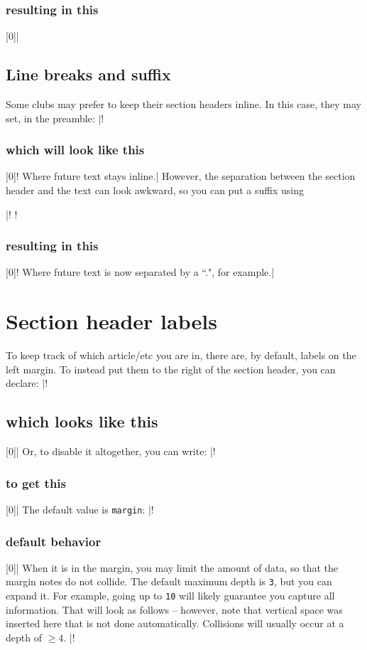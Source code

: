 \documentclass{constitution}
\begin{document}
\subsubsection{resulting in this}[0]|

\subsection{Line breaks and suffix}
Some clubs may prefer to keep their section headers inline.
In this case, they may set, in the preamble:
\coderunex|!
\subsubsection{which will look like this}[0]!
Where future text stays inline.|
However, the separation between the section header and the text can look awkward, so you can put a suffix using\par
\coderunex|!
\def\afterheadertext{.}!
\subsubsection{resulting in this}[0]!
Where future text is now separated by a ``.", for example.|

\section{Section header labels}
To keep track of which article/etc you are in, there are, by default, labels on the left margin.
To instead put them to the right of the section header, you can declare:
\coderunex|\def\headerfullinfoside{inline}!
\subsection{which looks like this}[0]|
Or, to disable it altogether, you can write:
\coderunex|\def\headerfullinfoside{none}!
\subsubsection{to get this}[0]|
The default value is \verb|margin|:
\coderunex|\def\headerfullinfoside{margin}!
\subsubsection{default behavior}[0]|
When it is in the margin, you may limit the amount of data, so that the margin notes do not collide.
The default maximum depth is \verb|3|, but you can expand it.
For example, going up to \verb|10| will likely guarantee you capture all information.
That will look as follows -- however, note that vertical space was inserted here that is not done automatically.
Collisions will usually occur at a depth of $ \ge 4 $.
\def\extrathings{\def\headerfullinfoside{margin}\def\maxheaderfullinfosize{10}}%
\coderunex|\def\maxheaderfullinfosize{10}!
\end{document}
